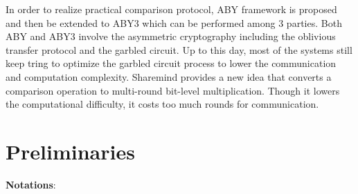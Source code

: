 \documentclass[letterpaper]{article} %
\begin{document}
    In order to realize practical comparison protocol, ABY framework \cite{ABY} is proposed
    and then be extended to ABY3 \cite{ABY3} which can be performed among 3 parties.
    Both ABY and ABY3 involve the asymmetric cryptography
    including the oblivious transfer protocol and the garbled circuit.
    Up to this day, most of the systems \cite{2022GarbledCircuit} still keep tring to optimize
    the garbled circuit process to lower the communication and computation complexity.
    Sharemind \cite{Sharemind} provides a new idea that converts a comparison operation to
    multi-round bit-level multiplication.
    Though it lowers the computational difficulty, it costs too much rounds for
    communication.

\section{Preliminaries}
    \textbf{Notations}:
\end{document}
